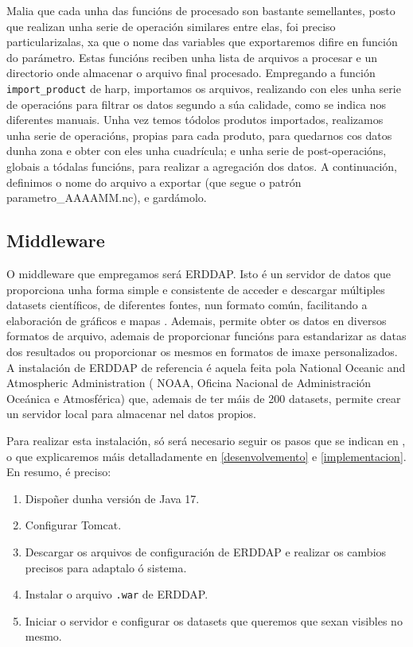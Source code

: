 Malia que cada unha das funcións de procesado son bastante semellantes, posto que realizan unha serie de operación similares entre elas, foi preciso particularizalas, xa que o nome das variables
que exportaremos difire en función do parámetro. Estas funcións reciben unha lista de arquivos a procesar e un directorio onde almacenar o arquivo final procesado. Empregando a función \texttt{
    import\_product} de harp, importamos os arquivos, realizando con eles unha serie de operacións para filtrar os datos segundo a súa calidade, como se indica nos diferentes manuais. Unha vez temos
tódolos produtos importados, realizamos unha serie de operacións, propias para cada produto, para quedarnos cos datos dunha zona e obter con eles unha cuadrícula; e unha serie de post-operacións,
globais a tódalas funcións, para realizar a agregación dos datos. A continuación, definimos o nome do arquivo a exportar (que segue o patrón parametro\_AAAAMM.nc), e gardámolo.

\subsection{Middleware}\label{middleware}
O middleware que empregamos será ERDDAP. Isto é un servidor de datos que proporciona unha forma simple e consistente de acceder e descargar múltiples datasets científicos, de diferentes fontes, nun
formato común, facilitando a elaboración de gráficos e mapas \cite{erddaphome}. Ademais, permite obter os datos en diversos formatos de arquivo, ademais de proporcionar funcións para estandarizar
as datas dos resultados ou proporcionar os mesmos en formatos de imaxe personalizados. A instalación de ERDDAP de referencia é aquela feita pola National Oceanic and Atmospheric Administration (
NOAA, Oficina Nacional de Administración Oceánica e Atmosférica) que, ademais de ter máis de 200 datasets, permite crear un servidor local para almacenar nel datos propios.

Para realizar esta instalación, só será necesario seguir os pasos que se indican en \cite{erddapsetup}, o que explicaremos máis detalladamente en \ref{desenvolvemento} e \ref{implementacion}. En
resumo, é preciso:
\begin{enumerate}
    \item Dispoñer dunha versión de Java 17.
    \item Configurar Tomcat.
    \item Descargar os arquivos de configuración de ERDDAP e realizar os cambios precisos para adaptalo ó sistema.
    \item Instalar o arquivo \texttt{.war} de ERDDAP.
    \item Iniciar o servidor e configurar os datasets que queremos que sexan visibles no mesmo.
\end{enumerate}

